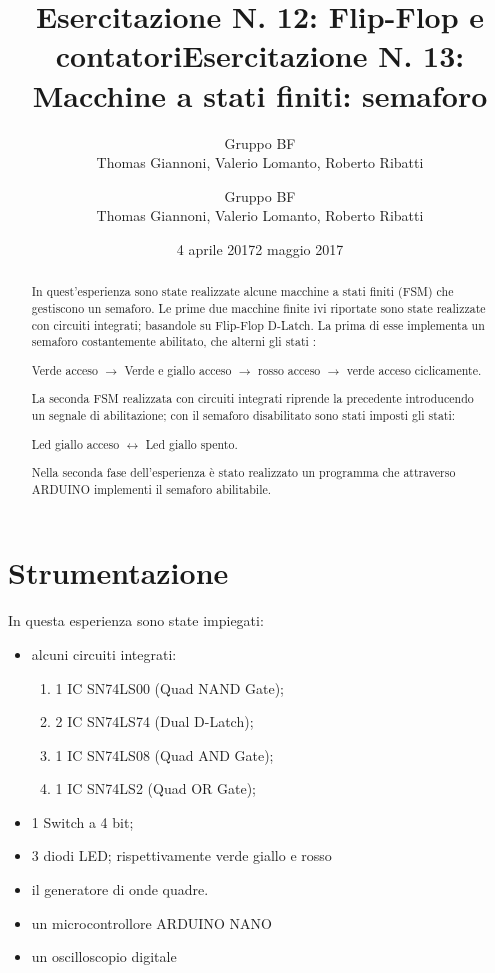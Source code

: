 \documentclass[a4paper,11pt]{article}
\author{Gruppo BF \\ Thomas Giannoni, Valerio Lomanto, Roberto Ribatti}
\title{Esercitazione N. 12: Flip-Flop e contatori}
\date{4 aprile 2017}
\author{Gruppo BF \\ Thomas Giannoni, Valerio Lomanto, Roberto Ribatti}
\title{Esercitazione N. 13: Macchine a stati finiti: semaforo }
\date{2 maggio 2017}
\begin{document}
\maketitle
\begin{abstract}
In quest'esperienza sono state realizzate  alcune macchine a stati finiti (FSM) che 
gestiscono un semaforo.
Le prime due macchine finite ivi riportate sono state realizzate con circuiti integrati; 
basandole su Flip-Flop D-Latch. La prima di esse implementa un semaforo costantemente abilitato, 
che alterni gli stati : 

Verde acceso $\longrightarrow$ Verde e 
giallo acceso $\longrightarrow$ rosso acceso $\longrightarrow$ 
verde acceso  ciclicamente.

La seconda FSM realizzata con 
circuiti integrati riprende la precedente introducendo un segnale di abilitazione; 
con il semaforo disabilitato sono stati imposti gli stati:

 Led giallo acceso $\leftrightarrow$ Led giallo spento.

Nella seconda fase dell'esperienza è stato realizzato un programma che attraverso ARDUINO
 implementi il semaforo abilitabile.
\end{abstract}

\section{Strumentazione}
	In questa esperienza sono state impiegati:
	\begin{itemize}
		\item alcuni circuiti integrati:
		\begin{enumerate}
			\item 1 IC SN74LS00 (Quad NAND Gate);
			\item 2 IC SN74LS74 (Dual D-Latch);
			\item 1 IC SN74LS08 (Quad AND Gate);
			\item 1 IC SN74LS2 (Quad OR Gate);
		\end{enumerate}
		\item 1 Switch a 4 bit;
		\item 3 diodi LED; rispettivamente verde giallo e rosso
		\item il generatore di onde quadre.
		\item un microcontrollore ARDUINO NANO
		\item un oscilloscopio digitale
	\end{itemize}
\end{document}
